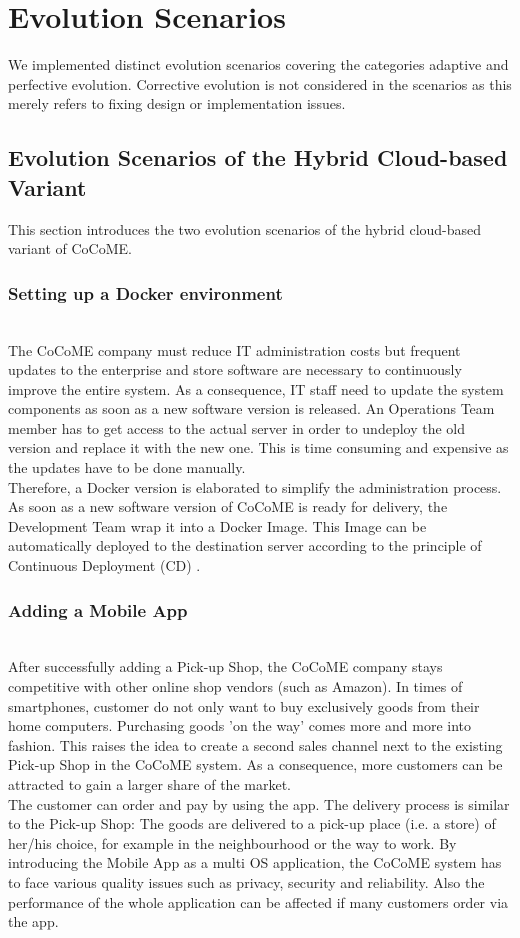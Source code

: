 \chapter{Evolution Scenarios}
We implemented distinct evolution scenarios covering the categories adaptive and perfective
evolution. Corrective evolution is not considered in the scenarios as this merely refers to fixing design or implementation issues.

\section{Evolution Scenarios of the Hybrid Cloud-based Variant}
This section introduces the two evolution scenarios of the hybrid cloud-based variant of
CoCoME.
\subsection{Setting up a Docker environment}
~\\The CoCoME company must reduce IT administration costs but frequent updates to the enterprise and store software are necessary to continuously improve the entire system. As a consequence, IT staff need to update the system components as soon as a new software version is released. An Operations Team member has to get access to the actual server in order to undeploy the old version and replace it with the new one. This is time consuming and expensive as the updates have to be done manually.\\
Therefore, a Docker version is elaborated to simplify the administration process. As soon as a new software version of CoCoME is ready for delivery, the Development Team wrap it into a Docker Image. This Image can be automatically deployed to the destination server according to the principle of Continuous Deployment (CD) \cite{olsson2012climbing}. 




\subsection{Adding a Mobile App}
~\\After successfully adding a Pick-up Shop, the CoCoME company stays competitive with other online shop vendors (such as Amazon). In times of smartphones, customer do not only want to buy exclusively goods from their home computers. Purchasing goods 'on the way' comes more and more into fashion. This raises the idea to create a second sales channel next to the existing Pick-up Shop in the CoCoME system. As a consequence, more customers can be attracted to gain a larger share of the market. 
\\
The customer can order and pay by using the app. The delivery process is similar to the Pick-up Shop: The goods are delivered to a pick-up place (i.e. a store) of her/his choice, for example in the neighbourhood or the way to work.
By introducing the Mobile App as a multi OS application, the CoCoME system has to face various quality issues such as privacy, security and reliability. Also the performance of the whole application can be affected if many customers order via the app.




